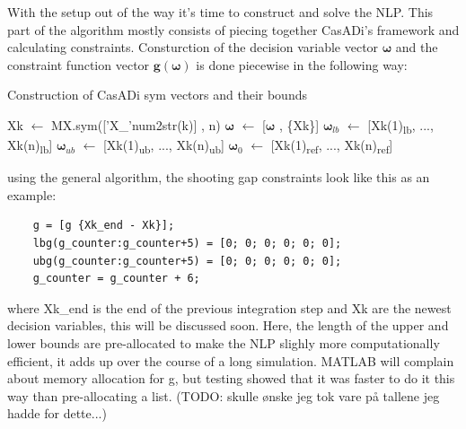 With the setup out of the way it's time to construct and solve the \gls{NLP}. This part of the algorithm
mostly consists of piecing together CasADi's framework and calculating constraints. Consturction of the decision variable vector $\bm{\omega}$ and the constraint function
vector $\textbf{g}(\bm{\omega})$ is done piecewise in the following way:
\begin{algorithm}[ht]
    \caption{Construction of CasADi sym vectors and their bounds} \label{ALG: general CasADi sym}
    \begin{algorithmic}
        \State Xk $\gets$ MX.sym(['X\_'num2str(k)] , n) 
        \State $\bm{\omega}$ $\gets$ [$\bm{\omega}$ , \{Xk\}]
        \State $\bm{\omega}_{lb}$ $\gets$ [Xk(1)\textsubscript{lb}, ..., Xk(n)\textsubscript{lb}]
        \State $\bm{\omega}_{ub}$ $\gets$ [Xk(1)\textsubscript{ub}, ..., Xk(n)\textsubscript{ub}]
        \State $\bm{\omega}_0$ $\gets$ [Xk(1)\textsubscript{ref}, ..., Xk(n)\textsubscript{ref}] 
    \end{algorithmic}
\end{algorithm}

using the general algorithm, the shooting gap constraints look like this as an example:
\begin{lstlisting}
    g = [g {Xk_end - Xk}];
    lbg(g_counter:g_counter+5) = [0; 0; 0; 0; 0; 0];
    ubg(g_counter:g_counter+5) = [0; 0; 0; 0; 0; 0];
    g_counter = g_counter + 6;
\end{lstlisting}
where Xk\_end is the end of the previous integration step and Xk are the newest decision variables, this will be discussed soon.
Here, the length of the upper and lower bounds are pre-allocated to make the \gls{NLP} slighly more computationally efficient,
it adds up over the course of a long simulation. MATLAB will complain about memory allocation for g, 
but testing showed that it was faster to do it this way than pre-allocating a list. 
(TODO: skulle ønske jeg tok vare på tallene jeg hadde for dette...)



